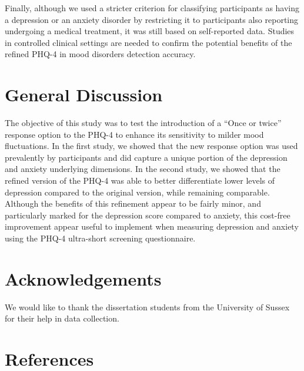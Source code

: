 \documentclass[
  man,
  floatsintext,
  longtable,
  nolmodern,
  notxfonts,
  notimes,
  colorlinks=true,linkcolor=blue,citecolor=blue,urlcolor=blue]{apa7}
\begin{document}
Finally, although we used a stricter criterion for classifying
participants as having a depression or an anxiety disorder by
restricting it to participants also reporting undergoing a medical
treatment, it was still based on self-reported data. Studies in
controlled clinical settings are needed to confirm the potential
benefits of the refined PHQ-4 in mood disorders detection accuracy.

\section{General Discussion}\label{general-discussion}

The objective of this study was to test the introduction of a ``Once or
twice'' response option to the PHQ-4 to enhance its sensitivity to
milder mood fluctuations. In the first study, we showed that the new
response option was used prevalently by participants and did capture a
unique portion of the depression and anxiety underlying dimensions. In
the second study, we showed that the refined version of the PHQ-4 was
able to better differentiate lower levels of depression compared to the
original version, while remaining comparable. Although the benefits of
this refinement appear to be fairly minor, and particularly marked for
the depression score compared to anxiety, this cost-free improvement
appear useful to implement when measuring depression and anxiety using
the PHQ-4 ultra-short screening questionnaire.

\section{Acknowledgements}\label{acknowledgements}

We would like to thank the dissertation students from the University of
Sussex for their help in data collection.

\section{References}\label{references}
\end{document}
